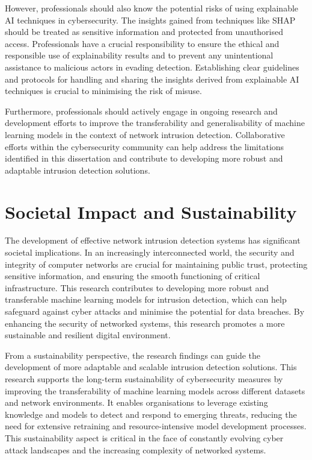 However, professionals should also know the potential risks of using explainable AI techniques in cybersecurity. The insights gained from techniques like SHAP should be treated as sensitive information and protected from unauthorised access. Professionals have a crucial responsibility to ensure the ethical and responsible use of explainability results and to prevent any unintentional assistance to malicious actors in evading detection. Establishing clear guidelines and protocols for handling and sharing the insights derived from explainable AI techniques is crucial to minimising the risk of misuse.

Furthermore, professionals should actively engage in ongoing research and development efforts to improve the transferability and generalisability of machine learning models in the context of network intrusion detection. Collaborative efforts within the cybersecurity community can help address the limitations identified in this dissertation and contribute to developing more robust and adaptable intrusion detection solutions.

\section{Societal Impact and Sustainability}
The development of effective network intrusion detection systems has significant societal implications. In an increasingly interconnected world, the security and integrity of computer networks are crucial for maintaining public trust, protecting sensitive information, and ensuring the smooth functioning of critical infrastructure. This research contributes to developing more robust and transferable machine learning models for intrusion detection, which can help safeguard against cyber attacks and minimise the potential for data breaches. By enhancing the security of networked systems, this research promotes a more sustainable and resilient digital environment.

From a sustainability perspective, the research findings can guide the development of more adaptable and scalable intrusion detection solutions. This research supports the long-term sustainability of cybersecurity measures by improving the transferability of machine learning models across different datasets and network environments. It enables organisations to leverage existing knowledge and models to detect and respond to emerging threats, reducing the need for extensive retraining and resource-intensive model development processes. This sustainability aspect is critical in the face of constantly evolving cyber attack landscapes and the increasing complexity of networked systems.


